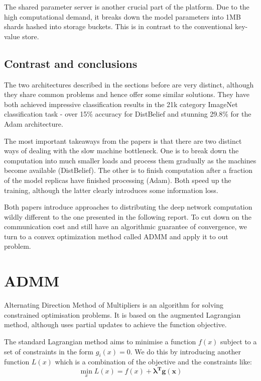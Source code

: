 \documentclass[a4paper, 12pt]{article}
\numberwithin{equation}{section}
\begin{document}
	The shared parameter server is another crucial part of the platform. Due to the high computational demand, it breaks down the model parameters into 1MB shards hashed into storage buckets. This is in contrast to the conventional key-value store.

	\subsection{Contrast and conclusions}

	The two architectures described in the sections before are very distinct, although they share common problems and hence offer some similar solutions. They have both achieved impressive classification results in the 21k category ImageNet classification task - over 15\% accuracy for DistBelief and stunning 29.8\% for the Adam architecture.

	The most important takeaways from the papers is that there are two distinct ways of dealing with the slow machine bottleneck. One is to break down the computation into much smaller loads and process them gradually as the machines become available (DistBelief). The other is to finish computation after a fraction of the model replicas have finished processing (Adam). Both speed up the training, although the latter clearly introduces some information loss.
	
	Both papers introduce approaches to distributing the deep network computation wildly different to the one presented in the following report. To cut down on the communication cost and still have an algorithmic guarantee of convergence, we turn to a convex optimization method called ADMM and apply it to out problem.


	\section{ADMM}
	\label{ADMM}

	Alternating Direction Method of Multipliers is an algorithm for solving constrained optimisation problems. It is based on the augmented Lagrangian method, although uses partial updates to achieve the function objective.

	The standard Lagrangian method aims to minimise a function $f(x)$ subject to a set of constraints in the form $g_i(x)=0$. We do this by introducing another function $L(x)$ which is a combination of the objective and the constraints like:
	\begin{equation}
	\min_{x} L(x) = f(x) + \boldsymbol{\lambda^T g(x)}
	\end{equation}
\end{document}
